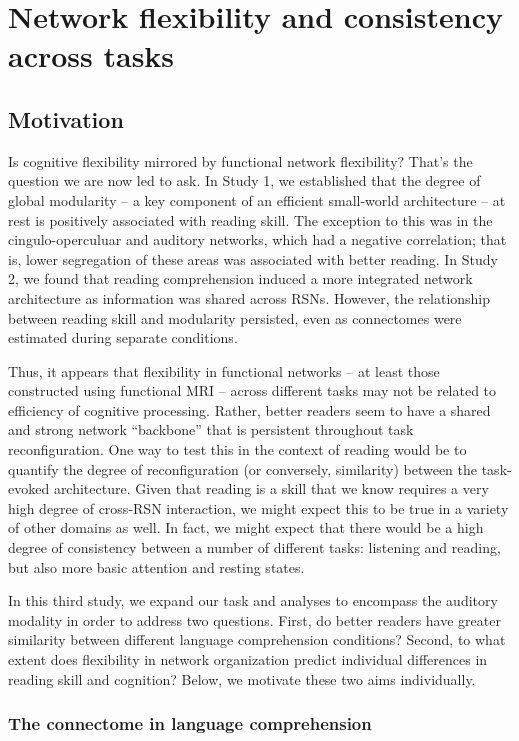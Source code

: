 \chapter{Network flexibility and consistency across tasks}

\section{Motivation}

Is cognitive flexibility mirrored by functional network flexibility? That's the question we are now led to ask. In Study 1, we established that the degree of global modularity -- a key component of an efficient small-world architecture -- at rest is positively associated with reading skill. The exception to this was in the cingulo-operculuar and auditory networks, which had a negative correlation; that is, lower segregation of these areas was associated with better reading. In Study 2, we found that reading comprehension induced a more integrated network architecture as information was shared across RSNs. However, the relationship between reading skill and modularity persisted, even as connectomes were estimated during separate conditions. 

Thus, it appears that flexibility in functional networks -- at least those constructed using functional MRI -- across different tasks may not be related to efficiency of cognitive processing. Rather, better readers seem to have a shared and strong network ``backbone'' that is persistent throughout task reconfiguration. One way to test this in the context of reading would be to quantify the degree of reconfiguration (or conversely, similarity) between the task-evoked architecture. Given that reading is a skill that we know requires a very high degree of cross-RSN interaction, we might expect this to be true in a variety of other domains as well. In fact, we might expect that there would be a high degree of consistency between a number of different tasks: listening and reading, but also more basic attention and resting states. 

In this third study, we expand our task and analyses to encompass the auditory modality in order to address two questions. First, do better readers have greater similarity between different language comprehension conditions? Second, to what extent does flexibility in network organization predict individual differences in reading skill and cognition? Below, we motivate these two aims individually.

\subsection{The connectome in language comprehension}

